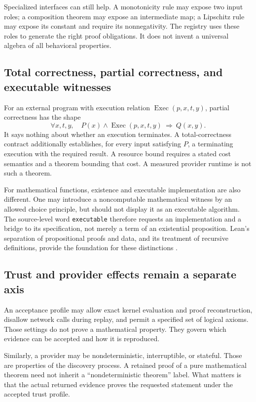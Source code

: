 \documentclass[11pt,letterpaper]{article}
\newcommand{\code}[1]{\nolinkurl{#1}}
\theoremstyle{remark}
\begin{document}
Specialized interfaces can still help. A monotonicity rule may expose two
input roles; a composition theorem may expose an intermediate map; a
Lipschitz rule may expose its constant and require its nonnegativity.
The registry uses these roles to generate the right proof obligations.
It does not invent a universal algebra of all behavioral properties.

\subsection{Total correctness, partial correctness, and executable witnesses}
For an external program with execution relation
$\operatorname{Exec}(p,x,t,y)$, partial correctness has the shape
\[
 \forall x,t,y,\quad P(x)\land\operatorname{Exec}(p,x,t,y)
       \ \Longrightarrow\ Q(x,y).
\]
It says nothing about whether an execution terminates. A total-correctness
contract additionally establishes, for every input satisfying $P$, a
terminating execution with the required result. A resource bound requires a
stated cost semantics and a theorem bounding that cost. A measured provider
runtime is not such a theorem.

For mathematical functions, existence and executable implementation are also
different. One may introduce a noncomputable mathematical witness by an
allowed choice principle, but should not display it as an executable
algorithm. The source-level word \code{executable} therefore requests an
implementation and a bridge to its specification, not merely a term of an
existential proposition. Lean's separation of propositional proofs and data,
and its treatment of recursive definitions, provide the foundation for these
distinctions \cite{leaninductive,leanrecursive}.

\subsection{Trust and provider effects remain a separate axis}
An acceptance profile may allow exact kernel evaluation and proof
reconstruction, disallow network calls during replay, and permit a specified
set of logical axioms. Those settings do not prove a mathematical property.
They govern which evidence can be accepted and how it is reproduced.

Similarly, a provider may be nondeterministic, interruptible, or stateful.
Those are properties of the discovery process. A retained proof of a pure
mathematical theorem need not inherit a ``nondeterministic theorem'' label.
What matters is that the actual returned evidence proves the requested
statement under the accepted trust profile.
\end{document}
